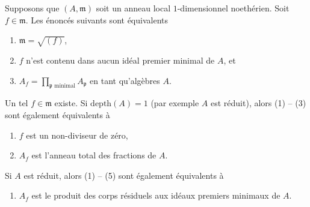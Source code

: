 \begin{lemma}
\label{lemma-pre-pre-delta-invariant}
Supposons que $(A, \mathfrak m)$ soit un anneau local $1$-dimensionnel
noethérien. Soit $f \in \mathfrak m$. Les énoncés suivants sont équivalents
\begin{enumerate}
\item $\mathfrak m = \sqrt{(f)}$, \item $f$ n'est contenu dans
aucun idéal premier minimal de $A$, et \item $A_f =
\prod_{\mathfrak p\text{ minimal}} A_\mathfrak p$ en tant qu'algèbres $A$.
\end{enumerate}
Un tel $f \in \mathfrak m$ existe. Si $\text{depth}(A) = 1$ (par
exemple $A$ est réduit), alors (1) -- (3) sont également équivalents à
\begin{enumerate}
\item [(4)] $f$ est un non-diviseur de zéro, \item
[(5)] $A_f$ est l'anneau total des fractions de $A$.
\end{enumerate}
Si $A$ est réduit, alors (1) -- (5) sont également équivalents à
\begin{enumerate}
\item [(6)] $A_f$ est le produit des corps
résiduels aux idéaux premiers minimaux de $A$.
\end{enumerate}
\end{lemma}

